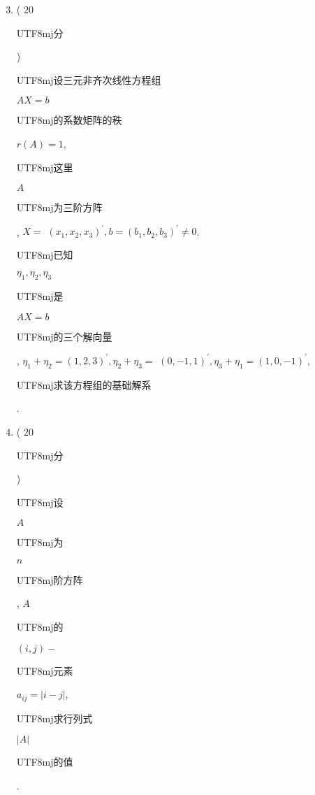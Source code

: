 \documentclass[10pt]{article}
\begin{document}
\begin{enumerate}
  \setcounter{enumi}{2}
  \item ( 20 \begin{CJK}{UTF8}{mj}分\end{CJK}) \begin{CJK}{UTF8}{mj}设三元非齐次线性方程组\end{CJK} $A X=b$ \begin{CJK}{UTF8}{mj}的系数矩阵的秩\end{CJK} $r(A)=1$, \begin{CJK}{UTF8}{mj}这里\end{CJK} $A$ \begin{CJK}{UTF8}{mj}为三阶方阵\end{CJK}, $X=$ $\left(x_{1}, x_{2}, x_{3}\right)^{\prime}, b=\left(b_{1}, b_{2}, b_{3}\right)^{\prime} \neq 0$. \begin{CJK}{UTF8}{mj}已知\end{CJK} $\eta_{1}, \eta_{2}, \eta_{3}$ \begin{CJK}{UTF8}{mj}是\end{CJK} $A X=b$ \begin{CJK}{UTF8}{mj}的三个解向量\end{CJK}, $\eta_{1}+\eta_{2}=(1,2,3)^{\prime}, \eta_{2}+\eta_{3}=$ $(0,-1,1)^{\prime}, \eta_{3}+\eta_{1}=(1,0,-1)^{\prime}$, \begin{CJK}{UTF8}{mj}求该方程组的基础解系\end{CJK}.

  \item ( 20 \begin{CJK}{UTF8}{mj}分\end{CJK}) \begin{CJK}{UTF8}{mj}设\end{CJK} $A$ \begin{CJK}{UTF8}{mj}为\end{CJK} $n$ \begin{CJK}{UTF8}{mj}阶方阵\end{CJK}, $A$ \begin{CJK}{UTF8}{mj}的\end{CJK} $(i, j)-$ \begin{CJK}{UTF8}{mj}元素\end{CJK} $a_{i j}=|i-j|$, \begin{CJK}{UTF8}{mj}求行列式\end{CJK} $|A|$ \begin{CJK}{UTF8}{mj}的值\end{CJK}.


\end{enumerate}
\end{document}
